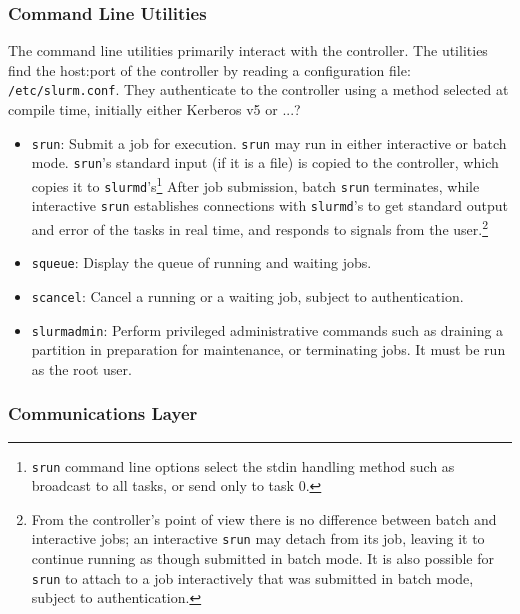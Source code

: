\subsubsection{Command Line Utilities}

The command line utilities primarily interact with the controller.
The utilities find the host:port of the controller by reading a configuration 
file: {\tt /etc/slurm.conf}.
They authenticate to the controller using a method selected at compile
time, initially either Kerberos v5 or ...?


\begin{itemize}
\item {\tt srun}: Submit a job for execution.  {\tt srun} may run in either
interactive or batch mode.  {\tt srun}'s standard input (if it is a file) is 
copied to the controller, which copies it to {\tt slurmd}'s\footnote{{\tt srun}
command line options select the stdin handling method such as broadcast to 
all tasks, or send only to task 0.}
After job submission, batch {\tt srun} terminates, while interactive 
{\tt srun} establishes connections with {\tt slurmd}'s to get standard output 
and error of the tasks in real time, and responds to signals from the 
user.\footnote{From the controller's point of view there is no difference 
between batch and interactive jobs;  an interactive {\tt srun} may detach from 
its job, leaving it to continue running as though submitted in batch mode.
It is also possible for {\tt srun} to attach to a job interactively that
was submitted in batch mode, subject to authentication.}

\item {\tt squeue}: Display the queue of running and waiting jobs.

\item {\tt scancel}: Cancel a running or a waiting job, subject to
authentication.

\item {\tt slurmadmin}: Perform privileged administrative commands
such as draining a partition in preparation for maintenance, or terminating
jobs.  It must be run as the root user.

\end{itemize}

\subsubsection{Communications Layer}

